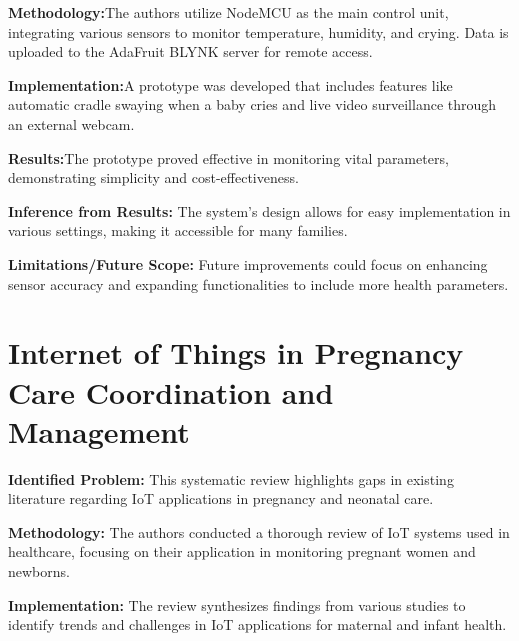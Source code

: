 \documentclass[12pt,a4paper]{report}
\begin{document}
\setlength{\parskip}{1em}  %

\noindent\textbf{Methodology:}The authors utilize NodeMCU as the main control unit, integrating various sensors to monitor temperature, humidity, and crying. Data is uploaded to the AdaFruit BLYNK server for remote access.
\setlength{\parskip}{1em}  %

\noindent\textbf{Implementation:}A prototype was developed that includes features like automatic cradle swaying when a baby cries and live video surveillance through an external webcam.
\setlength{\parskip}{1em}  %

\noindent\textbf{Results:}The prototype proved effective in monitoring vital parameters, demonstrating simplicity and cost-effectiveness.

\setlength{\parskip}{1em}  %

\noindent\textbf{Inference from Results:} The system's design allows for easy implementation in various settings, making it accessible for many families.
\setlength{\parskip}{1em}  %

\noindent\textbf{Limitations/Future Scope:} Future improvements could focus on enhancing sensor accuracy and expanding functionalities to include more health parameters.
\setlength{\parskip}{1em}  %

\section{Internet of Things in Pregnancy Care Coordination and Management}

\textbf{Identified Problem: }This systematic review highlights gaps in existing literature regarding IoT applications in pregnancy and neonatal care\cite{Hossain2023}.
\setlength{\parskip}{1em}  %


\noindent\textbf{Methodology:} The authors conducted a thorough review of IoT systems used in healthcare, focusing on their application in monitoring pregnant women and newborns.
\setlength{\parskip}{1em}  %


\noindent\textbf{Implementation:} The review synthesizes findings from various studies to identify trends and challenges in IoT applications for maternal and infant health.
\setlength{\parskip}{1em}  %
\end{document}
